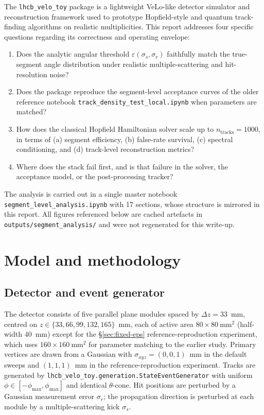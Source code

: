 \documentclass[11pt,a4paper]{article}
\newcommand{\nt}{n_\text{tracks}}
\newcommand{\sss}{\sigma_s}
\newcommand{\srr}{\sigma_r}
\newcommand{\eps}{\varepsilon}
\begin{document}
The \texttt{lhcb\_velo\_toy} package is a lightweight VeLo-like detector
simulator and reconstruction framework used to prototype Hopfield-style
\cite{Hopfield:1982,Denby:1988,Peterson:1989,Stimpfl-Abele:1991} and
quantum \cite{Funcke:2023:qtracking,Nilles:2023:qtracking} track-finding
algorithms on realistic multiplicities. This report addresses four
specific questions regarding its correctness and operating envelope:
\begin{enumerate}
  \item Does the analytic angular threshold $\eps(\sss,\srr)$ faithfully
        match the true-segment angle distribution under realistic
        multiple-scattering and hit-resolution noise?
  \item Does the package reproduce the segment-level acceptance curves of
        the older reference notebook \texttt{track\_density\_test\_local.ipynb}
        when parameters are matched?
  \item How does the classical Hopfield Hamiltonian solver scale up to
        $\nt = 1000$, in terms of (a) segment efficiency, (b) false-rate
        survival, (c) spectral conditioning, and (d) track-level
        reconstruction metrics?
  \item Where does the stack fail first, and is that failure in the
        solver, the acceptance model, or the post-processing tracker?
\end{enumerate}

The analysis is carried out in a single master notebook
\texttt{segment\_level\_analysis.ipynb} with 17 sections, whose structure
is mirrored in this report. All figures referenced below are cached
artefacts in \texttt{outputs/segment\_analysis/} and were not
regenerated for this write-up.

\section{Model and methodology}\label{sec:method}

\subsection{Detector and event generator}
The detector consists of five parallel plane modules spaced by
$\Delta z = 33$~mm, centred on $z \in \{33,66,99,132,165\}$~mm, each of
active area $80 \times 80\ \mathrm{mm}^2$ (half-width $40$~mm) except
for the \S\ref{sec:fixed-eps} reference-reproduction experiment, which
uses $160 \times 160\ \mathrm{mm}^2$ for parameter matching to the
earlier study. Primary vertices are drawn from a Gaussian with
$\sigma_{xyz} = (0,0,1)$~mm in the default sweeps and $(1,1,1)$~mm in
the reference-reproduction experiment.
Tracks are generated by
\texttt{lhcb\_velo\_toy.generation.StateEventGenerator} with uniform
$\phi\in[-\phi_\mathrm{max},\phi_\mathrm{max}]$ and identical
$\theta$-cone. Hit positions are perturbed by a Gaussian measurement
error $\srr$; the propagation direction is perturbed at each module by
a multiple-scattering kick $\sss$.
\end{document}
